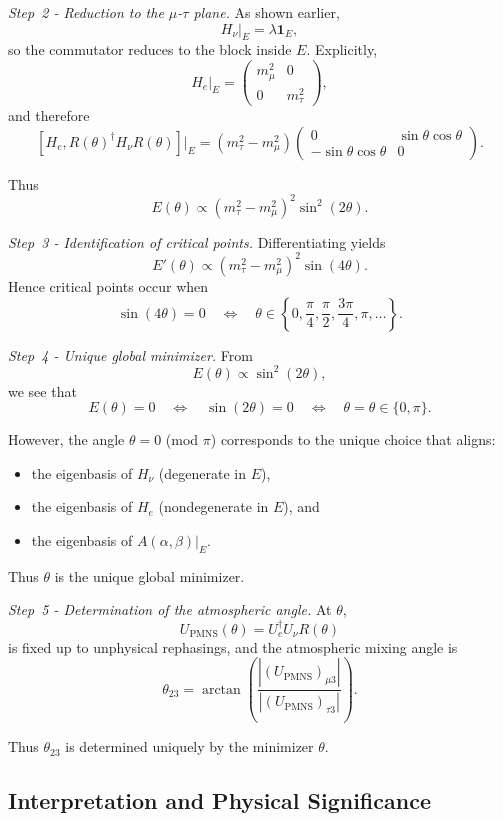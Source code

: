 \emph{Step~2 - Reduction to the $\mu$-$\tau$ plane.}
As shown earlier,
\[
H_\nu|_E = \lambda \mathbf 1_E,
\]
so the commutator reduces to the block inside $E$. Explicitly,
\[
H_e|_E =
\begin{pmatrix}
m_\mu^2 & 0 \\
0 & m_\tau^2
\end{pmatrix},
\]
and therefore
\[
[H_e, R(\theta)^\dagger H_\nu R(\theta)]|_E
= (m_\tau^2 - m_\mu^2)
\begin{pmatrix}
0 & \sin\theta\cos\theta \\
-\sin\theta\cos\theta & 0
\end{pmatrix}.
\]

Thus
\[
E(\theta)\propto (m_\tau^2 - m_\mu^2)^2 \sin^2(2\theta).
\]

\emph{Step~3 - Identification of critical points.}
Differentiating yields
\[
E'(\theta)\propto (m_\tau^2 - m_\mu^2)^2 \sin(4\theta).
\]
Hence critical points occur when
\[
\sin(4\theta)=0
\quad\Longleftrightarrow\quad
\theta\in\left\{0,\frac{\pi}{4},\frac{\pi}{2},\frac{3\pi}{4},\pi,\ldots\right\}.
\]

\emph{Step~4 - Unique global minimizer.}
From
\[
E(\theta)\propto \sin^2(2\theta),
\]
we see that
\[
E(\theta)=0
\quad\Longleftrightarrow\quad
\sin(2\theta)=0
\quad\Longleftrightarrow\quad
\theta=\theta\in\{0,\pi\}.
\]

However, the angle $\theta=0$ (mod $\pi$) corresponds to the unique choice that aligns:
\begin{itemize}
\item the eigenbasis of $H_\nu$ (degenerate in $E$),
\item the eigenbasis of $H_e$ (nondegenerate in $E$), and
\item the eigenbasis of $A(\alpha,\beta)|_E$.
\end{itemize}

Thus $\theta$ is the unique global minimizer.

\emph{Step~5 - Determination of the atmospheric angle.}
At $\theta$,
\[
U_{\mathrm{PMNS}}(\theta)=U_e^\dagger U_\nu R(\theta)
\]
is fixed up to unphysical rephasings, and the atmospheric mixing angle is
\[
\theta_{23}
= \arctan\!\left(
\frac{|(U_{\mathrm{PMNS}})_{\mu 3}|}
{|(U_{\mathrm{PMNS}})_{\tau 3}|}
\right).
\]

Thus $\theta_{23}$ is determined uniquely by the minimizer $\theta$.

\subsection{Interpretation and Physical Significance}


